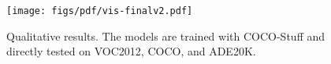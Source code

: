 \begin{figure}
\begin{center}
   \texttt{[image: figs/pdf/vis-finalv2.pdf]}
\end{center}
\vspace{-3mm}
   \caption{
   Qualitative results. The models are trained with COCO-Stuff and directly tested on VOC2012, COCO, and ADE20K.
   }
\label{fig:vis-final}
\end{figure}

